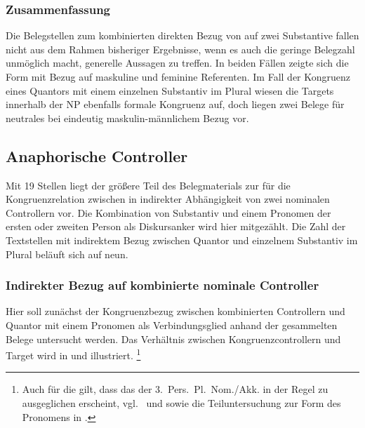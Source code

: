 \subsubsection{Zusammenfassung}

Die Belegstellen zum kombinierten direkten Bezug von \mbox{} auf
zwei Substantive fallen nicht aus dem Rahmen bisheriger Ergebnisse, wenn es
auch die geringe Belegzahl unmöglich macht, generelle Aussagen zu treffen. In
beiden Fällen zeigte sich die Form  mit Bezug auf maskuline und
feminine Referenten. Im Fall der Kongruenz eines Quantors mit einem einzelnen
Substantiv im Plural wiesen die Targets innerhalb der NP
ebenfalls formale Kongruenz auf, doch liegen zwei Belege für neutrales
 bei eindeutig maskulin-männlichem Bezug vor.


\subsection{Anaphorische Controller}

Mit 19 Stellen liegt der größere Teil des Belegmaterials zur \KC{} für die
Kongruenzrelation zwischen  in indirekter Abhängigkeit von zwei
nominalen Controllern vor. Die Kombination von Substantiv und einem Pronomen
der ersten oder zweiten Person als Diskurs\-anker wird hier
mitgezählt. Die Zahl der Textstellen mit indirektem Bezug zwischen Quantor und
einzelnem Substantiv im Plural beläuft sich auf neun.

\subsubsection{Indirekter Bezug auf kombinierte nominale Controller}
\label{subsubssec:iconomctrlpers}

Hier soll zunächst der Kongruenzbezug zwischen kombinierten Controllern und
Quantor mit einem Pronomen als Verbindungsglied anhand der gesammelten Belege
untersucht werden. Das Verhältnis zwischen Kongruenzcontrollern und Target wird
in  und  illustriert.%
%
	\footnote{Auch für die \KC{} gilt, dass das  der
		3.~Pers.\ Pl.\ Nom./Akk. in der Regel zu  ausgeglichen
		erscheint,
		vgl.~\citet[213--214]{paul2007} und \citet[369, 390--397]{ksw2} sowie
		die Teiluntersuchung zur Form des Pronomens in
		.}

